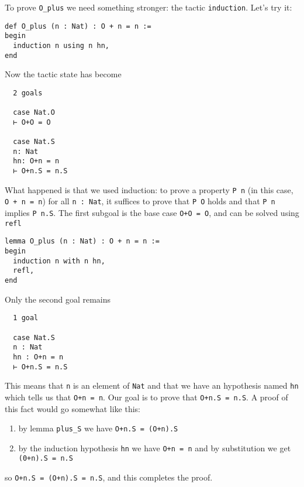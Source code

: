\documentclass{book}
\theoremstyle{definition}
\theoremstyle{remark}
\theoremstyle{plain}
\begin{document}
To prove \lstinline{O_plus} we need something stronger: the tactic \lstinline{induction}.
Let's try it:
\begin{lstlisting}
def O_plus (n : Nat) : O + n = n :=
begin
  induction n using n hn,
end
\end{lstlisting}
Now the tactic state has become
\begin{lstlisting}
  2 goals

  case Nat.O
  ⊢ O+O = O

  case Nat.S
  n: Nat
  hn: O+n = n
  ⊢ O+n.S = n.S
\end{lstlisting}
What happened is that we used induction:
to prove a property \lstinline{P n} (in this case, \lstinline{O + n = n}) for all \lstinline{n : Nat},
it suffices to prove that \lstinline{P O} holds and that \lstinline{P n} implies \lstinline{P n.S}.
The first subgoal is the base case \lstinline{O+O = O}, and can be solved using \lstinline{refl}
\begin{lstlisting}
lemma O_plus (n : Nat) : O + n = n :=
begin
  induction n with n hn,
  refl,
end
\end{lstlisting}
Only the second goal remains
\begin{lstlisting}
  1 goal

  case Nat.S
  n : Nat
  hn : O+n = n
  ⊢ O+n.S = n.S
\end{lstlisting}
This means that \lstinline{n} is an element of \lstinline{Nat}
and that we have an hypothesis named \lstinline{hn} which tells us that \lstinline{O+n = n}.
Our goal is to prove that \lstinline{O+n.S = n.S}.
A proof of this fact would go somewhat like this:
\begin{enumerate}
\item by lemma \lstinline{plus_S} we have \lstinline{O+n.S = (O+n).S}
\item by the induction hypothesis \lstinline{hn} we have \lstinline{O+n = n} and by substitution we get \lstinline{(0+n).S = n.S}
\end{enumerate}
so \lstinline{O+n.S = (O+n).S = n.S}, and this completes the proof.
\end{document}
